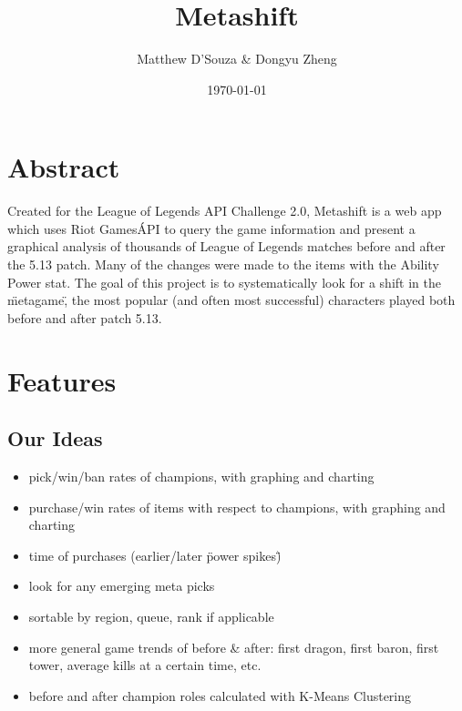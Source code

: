 \documentclass{article}
\title{Metashift}
\date{\today}
\author{Matthew D'Souza \& Dongyu Zheng}
\begin{document}
\maketitle
{}

\newpage
\tableofcontents

\newpage
{}



\section{Abstract}

Created for the League of Legends API Challenge 2.0, Metashift is a web app which uses Riot Games\'API to query the game information and present a graphical analysis of thousands of League of Legends matches before and after the 5.13 patch. Many of the changes were made to the items with the Ability Power stat. The goal of this project is to systematically look for a shift in the \"metagame\", the most popular (and often most successful) characters played both before and after patch 5.13.


\section{Features}

\subsection{Our Ideas}
\begin{itemize}
    \item pick/win/ban rates of champions, with graphing and charting
    \item purchase/win rates of items with respect to champions, with graphing and charting
    \item time of purchases (earlier/later \"power spikes\")
    \item look for any emerging meta picks
    \item sortable by region, queue, rank if applicable
    \item more general game trends of before \& after: first dragon, first baron, first tower, average kills at a certain time, etc.
    \item before and after champion roles calculated with K-Means Clustering
\end{itemize}
\end{document}

